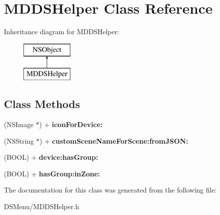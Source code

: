 \hypertarget{interface_m_d_d_s_helper}{\section{M\-D\-D\-S\-Helper Class Reference}
\label{interface_m_d_d_s_helper}
}
Inheritance diagram for M\-D\-D\-S\-Helper\-:\begin{figure}[H]
\begin{center}
\leavevmode
\includegraphics[height=2.000000cm]{interface_m_d_d_s_helper}
\end{center}
\end{figure}
\subsection*{Class Methods}
\begin{DoxyCompactItemize}
\item 
\hypertarget{interface_m_d_d_s_helper_a3f32213841f6409bca57bb0aa3d4d5c1}{(N\-S\-Image $\ast$) + {\bfseries icon\-For\-Device\-:}}\label{interface_m_d_d_s_helper_a3f32213841f6409bca57bb0aa3d4d5c1}

\item 
\hypertarget{interface_m_d_d_s_helper_ad7a3c10995dc96733a6ac86b30de6f2d}{(N\-S\-String $\ast$) + {\bfseries custom\-Scene\-Name\-For\-Scene\-:from\-J\-S\-O\-N\-:}}\label{interface_m_d_d_s_helper_ad7a3c10995dc96733a6ac86b30de6f2d}

\item 
\hypertarget{interface_m_d_d_s_helper_a81f16075bd0ff53c55472f89ed35f994}{(B\-O\-O\-L) + {\bfseries device\-:has\-Group\-:}}\label{interface_m_d_d_s_helper_a81f16075bd0ff53c55472f89ed35f994}

\item 
\hypertarget{interface_m_d_d_s_helper_aaea456daff4bdf1ce9f46850579d172e}{(B\-O\-O\-L) + {\bfseries has\-Group\-:in\-Zone\-:}}\label{interface_m_d_d_s_helper_aaea456daff4bdf1ce9f46850579d172e}

\end{DoxyCompactItemize}


The documentation for this class was generated from the following file\-:\begin{DoxyCompactItemize}
\item 
D\-S\-Menu/M\-D\-D\-S\-Helper.\-h\end{DoxyCompactItemize}

